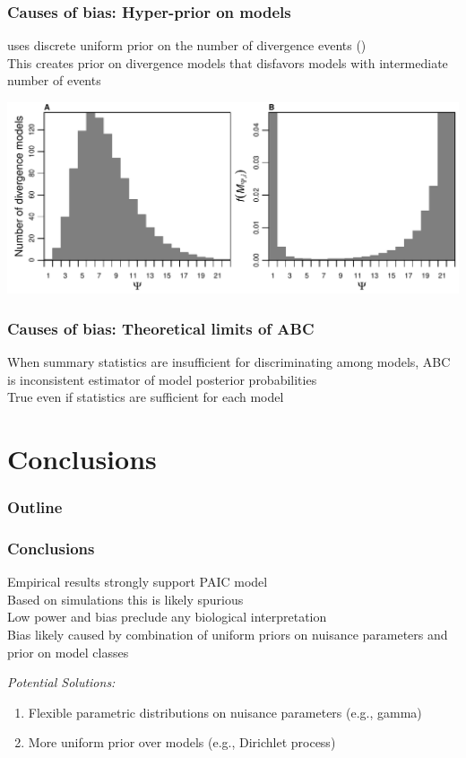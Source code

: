 \begin{frame}
    \frametitle{Causes of bias: Hyper-prior on models}
    \msb uses discrete uniform prior on the number of divergence events
    (\numt{})\\
    \bigskip
    This creates prior on divergence models that disfavors models with
    intermediate number of events\\
    \bigskip
    \centerline{
    \includegraphics[width=\textwidth]{images/partition_numbers.pdf}}
\end{frame}

\begin{frame}
    \frametitle{Causes of bias: Theoretical limits of ABC}
    When summary statistics are insufficient for discriminating among models,
    ABC is inconsistent estimator of model posterior probabilities
    \\
    \bigskip
    True even if statistics are sufficient for each model\\
\end{frame}

\section{Conclusions}

\begin{frame}
\frametitle{Outline}
\end{frame}

\begin{frame}
    \frametitle{Conclusions}
    Empirical results strongly support PAIC model \\
    \bigskip
    Based on simulations this is likely spurious \\
    \bigskip
    Low power and bias preclude any biological interpretation \\
    \bigskip
    Bias likely caused by combination of uniform priors on nuisance parameters
    and prior on model classes \\
    \bigskip
    \begin{block}{\it Potential Solutions:}
        \begin{enumerate}
            \item Flexible parametric distributions on nuisance parameters (e.g., gamma)
            \item More uniform prior over models (e.g., Dirichlet process)
        \end{enumerate}
    \end{block}
\end{frame}


